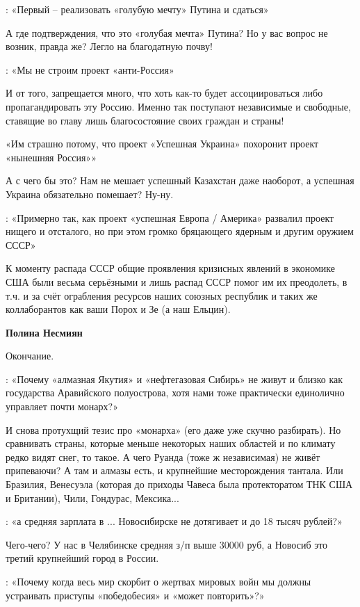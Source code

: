 \begin{itemize}
\begin{itemize}
: «Первый – реализовать «голубую мечту» Путина и сдаться»

А где подтверждения, что это «голубая мечта» Путина? Но у вас вопрос не возник,
правда же? Легло на благодатную почву!

: «Мы не строим проект «анти-Россия»

И от того, запрещается много, что хоть как-то будет ассоциироваться либо
пропагандировать эту Россию. Именно так поступают независимые и свободные,
ставящие во главу лишь благосостояние своих граждан и страны!

«Им страшно потому, что проект «Успешная Украина» похоронит проект «нынешняя Россия»»

А с чего бы это? Нам не мешает успешный Казахстан даже наоборот, а успешная
Украина обязательно помешает? Ну-ну.

: «Примерно так, как проект «успешная Европа / Америка» развалил проект нищего
и отсталого, но при этом громко бряцающего ядерным и другим оружием СССР»

К моменту распада СССР общие проявления кризисных явлений в экономике США были
весьма серьёзными и лишь распад СССР помог им их преодолеть, в т.ч. и за счёт
ограбления ресурсов наших союзных республик и таких же коллаборантов как ваши
Порох и Зе (а наш Ельцин).


\textbf{Полина Несмиян} 

Окончание. 

: «Почему «алмазная Якутия» и «нефтегазовая Сибирь» не живут и близко как государства Аравийского полуострова, хотя нами тоже практически единолично управляет почти монарх?»

И снова протухщий тезис про «монарха» (его даже уже скучно разбирать). Но
сравнивать страны, которые меньше некоторых наших областей и по климату редко
видят снег, то такое. А чего Руанда (тоже ж независимая) не живёт припеваючи? А
там и алмазы есть, и крупнейшие месторождения тантала. Или Бразилия, Венесуэла
(которая до приходы Чавеса была протекторатом ТНК США и Британии), Чили,
Гондурас, Мексика...

: «а средняя зарплата в ... Новосибирске не дотягивает и до 18 тысяч рублей?»

Чего-чего? У нас в Челябинске средняя з/п выше 30000 руб, а Новосиб это третий крупнейший город в России.

: «Почему когда весь мир скорбит о жертвах мировых войн мы должны устраивать приступы «победобесия» и «может повторить»?»


\end{itemize}
\end{itemize}
